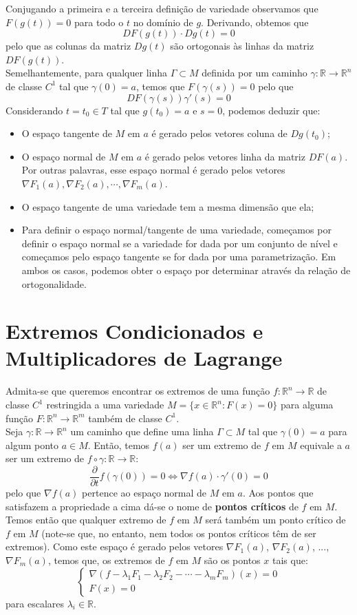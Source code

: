 \documentclass{article}
\newcommand{\R}{\mathbb{R}}
\begin{document}
Conjugando a primeira e a terceira definição de variedade observamos que $F(g(t))=0$ para todo o $t$ no domínio de $g$. Derivando, obtemos que
$$ DF(g(t)) \cdot Dg(t) = 0 $$
pelo que as colunas da matriz $Dg(t)$ são ortogonais às linhas da matriz $DF(g(t))$.\\
Semelhantemente, para qualquer linha $\Gamma \subset M$ definida por um caminho $\gamma: \R \to \R^n$ de classe $C^1$ tal que $\gamma(0) = a$, temos que $F(\gamma(s))=0$ pelo que 
$$ DF(\gamma(s))\gamma'(s) = 0 $$
Considerando $t = t_0 \in T$ tal que $g(t_0) = a$ e $s = 0$, podemos deduzir que:
\begin{itemize}
    \item O espaço tangente de $M$ em $a$ é gerado pelos vetores coluna de $Dg(t_0)$;
    \item O espaço normal de $M$ em $a$ é gerado pelos vetores linha da matriz $DF(a)$. Por outras palavras, esse espaço normal é gerado pelos vetores $\nabla F_1(a), \nabla F_2(a), \cdots, \nabla F_m(a)$.
    \item O espaço tangente de uma variedade tem a mesma dimensão que ela;
    \item Para definir o espaço normal/tangente de uma variedade, começamos por definir o espaço normal se a variedade for dada por um conjunto de nível e começamos pelo espaço tangente se for dada por uma parametrização. Em ambos os casos, podemos obter o espaço por determinar através da relação de ortogonalidade.
\end{itemize}

\section{Extremos Condicionados e Multiplicadores de Lagrange}
Admita-se que queremos encontrar os extremos de uma função $f: \R^n \to \R$ de classe $C^1$ restringida a uma variedade $M = \{x \in \R^n : F(x) = 0 \}$ para alguma função $F: \R^n \to \R^m$ também de classe $C^1$.\\
Seja $\gamma: \R \to \R^n$ um caminho que define uma linha $\Gamma \subset M$ tal que $\gamma(0) = a$ para algum ponto $a \in M$. Então, temos $f(a)$ ser um extremo de $f$ em $M$ equivale a $a$ ser um extremo de $f \circ \gamma: \R \to \R$:
$$ \frac{\partial}{\partial t} f(\gamma(0)) = 0 \Leftrightarrow 
   \nabla f(a) \cdot \gamma'(0) = 0 $$
pelo que $\nabla f(a)$ pertence ao espaço normal de $M$ em $a$. Aos pontos que satisfazem a propriedade a cima dá-se o nome de \textbf{pontos críticos} de $f$ em $M$. Temos então que qualquer extremo de $f$ em $M$ será também um ponto crítico de $f$ em $M$ (note-se que, no entanto, nem todos os pontos críticos têm de ser extremos). Como este espaço é gerado pelos vetores $\nabla F_1(a)$, $\nabla F_2(a)$, ..., $\nabla F_m(a)$, temos que, os extremos de $f$ em $M$ são os pontos $x$ tais que:
$$ \begin{cases}
\nabla \left( f - \lambda_1 F_1 - \lambda_2 F_2 - \cdots - \lambda_m F_m \right) (x) = 0 \\
F(x) = 0
\end{cases} $$
para escalares $\lambda_i \in \R$.
\end{document}
